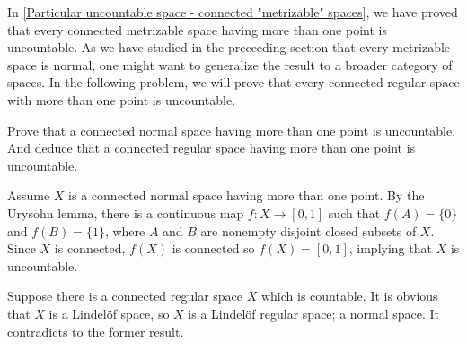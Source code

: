 In \cref{Particular uncountable space - connected "metrizable" spaces}, we have proved that every connected metrizable space having more than one point is uncountable.
As we have studied in the preceeding section that every metrizable space is normal, one might want to generalize the result to a broader category of spaces.
In the following problem, we will prove that every connected regular space with more than one point is uncountable.
\begin{prob}\label{nontrivial connected regular spaces are uncountable}
    Prove that a connected normal space having more than one point is uncountable.
    And deduce that a connected regular space having more than one point is uncountable.
\end{prob}
\begin{sol}
    Assume $X$ is a connected normal space having more than one point.
    By the Urysohn lemma, there is a continuous map $f: X\rightarrow[0, 1]$ such that $f(A)=\{0\}$ and $f(B)=\{1\}$, where $A$ and $B$ are nonempty disjoint closed subsets of $X$.
    Since $X$ is connected, $f(X)$ is connected so $f(X)=[0, 1]$, implying that $X$ is uncountable.
            
    Suppose there is a connected regular space $X$ which is countable.
    It is obvious that $X$ is a Lindel\"of space, so $X$ is a Lindel\"of regular space; a normal space.
    It contradicts to the former result.
\end{sol}